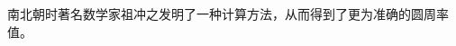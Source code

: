 \documentclass[UTF8,fontset=ubuntu]{ctexart}
\begin{document}
%	
%	
%	
%	
%	


南北朝时著名数学家祖冲之发明了一种计算方法，从而得到了更为准确的圆周率值。
\renewcommand{\notesname}{本章注释}
\theendnotes
\setcounter{endnote}{0}
\end{document}
